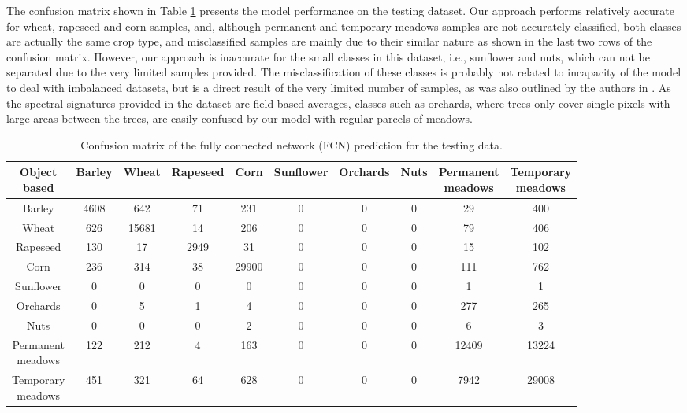 \documentclass[journal,article,submit,pdftex,moreauthors]{Definitions/mdpi}
\begin{document}
The confusion matrix shown in Table \ref{confusion_matrix} presents the model performance on the testing dataset.
Our approach performs relatively accurate for wheat, rapeseed and corn samples, and, although permanent and temporary meadows samples are not accurately classified, both classes are actually the same crop type, and misclassified samples are mainly due to their similar nature as shown in the last two rows of the confusion matrix. However, our approach is inaccurate for the small classes in this dataset, i.e., sunflower and nuts, which can not be separated due to the very limited samples provided. The misclassification of these classes is probably not related to incapacity of the model to deal with imbalanced datasets, but is a direct result of the very limited number of samples, as was also outlined by the authors in \cite{Russwurm2020}. As the spectral signatures provided in the dataset are field-based averages, classes such as orchards, where trees only cover single pixels with large areas between the trees, are easily confused by our model with regular parcels of meadows.
\begin{table}[H]
\centering
\scriptsize
\caption{Confusion matrix of the fully connected network (FCN) prediction for the testing data.}
\begin{tabular}{c|ccccccccc}
\hline
\makecell{Object\\based} & Barley & Wheat & Rapeseed & Corn & Sunflower & Orchards & Nuts & \makecell{Permanent\\meadows} & \makecell{Temporary\\meadows} \\ \hline
Barley      & 4608  & 642   & 71   & 231   & 0 & 0 & 0 & 29    & 400   \\
Wheat       & 626   & 15681 & 14   & 206   & 0 & 0 & 0 & 79   & 406   \\
Rapeseed    & 130   & 17    & 2949 & 31    & 0 & 0 & 0 & 15    & 102   \\
Corn        & 236   & 314   & 38   & 29900 & 0 & 0 & 0 & 111   & 762  \\
Sunflower   & 0     & 0 & 0 & 0 & 0 & 0 & 0 & 1 & 1 \\
Orchards    & 0     & 5 & 1 & 4 & 0 & 0 & 0 & 277   & 265   \\
Nuts        & 0     & 0 & 0 & 2 & 0 & 0 & 0 & 6 & 3 \\
\makecell{Permanent\\meadows}   & 122   & 212   & 4    & 163   & 0 & 0 & 0 & 12409 & 13224 \\
\makecell{Temporary\\meadows}   & 451   & 321   & 64    & 628   & 0 & 0 & 0 & 7942  & 29008 \\ 
\hline                  
\end{tabular}
\label{confusion_matrix}
\end{table}
\end{document}
